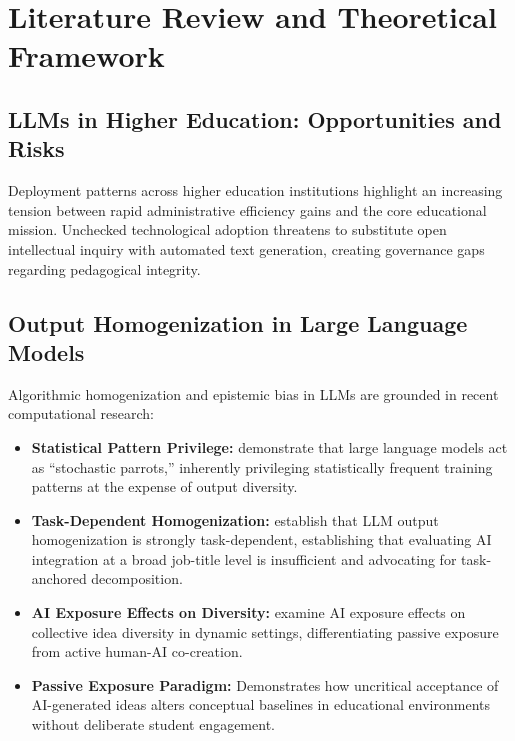 
\chapter{Literature Review and Theoretical Framework}
\section{LLMs in Higher Education: Opportunities and Risks}
Deployment patterns across higher education institutions highlight an increasing tension between rapid administrative efficiency gains and the core educational mission. Unchecked technological adoption threatens to substitute open intellectual inquiry with automated text generation, creating governance gaps regarding pedagogical integrity.

\section{Output Homogenization in Large Language Models}
Algorithmic homogenization and epistemic bias in LLMs are grounded in recent computational research:
\begin{itemize}
  \item \textbf{Statistical Pattern Privilege:} \cite{Bender2021} demonstrate that large language models act as ``stochastic parrots,'' inherently privileging statistically frequent training patterns at the expense of output diversity.
  \item \textbf{Task-Dependent Homogenization:} \cite{Jain2025} establish that LLM output homogenization is strongly task-dependent, establishing that evaluating AI integration at a broad job-title level is insufficient and advocating for task-anchored decomposition.
  \item \textbf{AI Exposure Effects on Diversity:} \cite{Ashkinaze2025} examine AI exposure effects on collective idea diversity in dynamic settings, differentiating passive exposure from active human-AI co-creation.
  \item \textbf{Passive Exposure Paradigm:} Demonstrates how uncritical acceptance of AI-generated ideas alters conceptual baselines in educational environments without deliberate student engagement.
\end{itemize}

